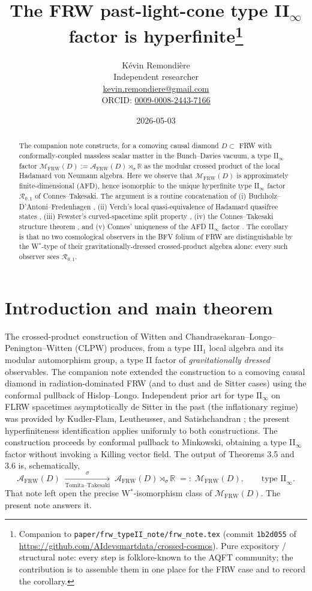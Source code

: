 \documentclass[11pt]{article}
\title{The FRW past-light-cone type II$_\infty$ factor is hyperfinite\thanks{Companion to \texttt{paper/frw\_typeII\_note/frw\_note.tex} (commit \texttt{1b2d055} of \url{https://github.com/AIdevsmartdata/crossed-cosmos}). Pure expository / structural note: every step is folklore-known to the AQFT community; the contribution is to assemble them in one place for the FRW case and to record the corollary.}}
\author{K\'evin Remondi\`ere\\
\small Independent researcher\\
\small \href{mailto:kevin.remondiere@gmail.com}{kevin.remondiere@gmail.com}\\
\small ORCID: \href{https://orcid.org/0009-0008-2443-7166}{0009-0008-2443-7166}}
\date{2026-05-03}
\theoremstyle{definition}
\newcommand{\R}{\mathbb{R}}
\renewcommand{\AA}{\mathcal{A}}
\newcommand{\MM}{\mathcal{M}}
\newcommand{\RR}{\mathcal{R}}
\newcommand{\FRW}{\mathrm{FRW}}
\begin{document}
\maketitle

\begin{abstract}
The companion note \cite{FrwNote2026} constructs, for a comoving causal diamond
$D \subset $ FRW with conformally-coupled massless scalar matter in the
Bunch--Davies vacuum, a type II$_\infty$ factor
$\MM_\FRW(D) := \AA_\FRW(D) \rtimes_\sigma \R$ as the modular crossed product
of the local Hadamard von Neumann algebra. Here we observe that
$\MM_\FRW(D)$ is approximately finite-dimensional (AFD), hence isomorphic to
the unique hyperfinite type II$_\infty$ factor $\RR_{0,1}$ of Connes--Takesaki.
The argument is a routine concatenation of (i) Buchholz--D'Antoni--Fredenhagen
\cite{BDF1987}, (ii) Verch's local quasi-equivalence of Hadamard quasifree
states \cite{Verch1994}, (iii) Fewster's curved-spacetime split property
\cite{Fewster2015Split}, (iv) the Connes--Takesaki structure theorem
\cite{ConnesTakesaki1977}, and (v) Connes' uniqueness of the AFD II$_\infty$
factor \cite{Connes1976}. The corollary is that no two cosmological observers
in the BFV folium of FRW are distinguishable by the W$^*$-type of their
gravitationally-dressed crossed-product algebra alone: every such observer sees
$\RR_{0,1}$.
\end{abstract}

\section{Introduction and main theorem}\label{sec:intro}

The crossed-product construction of Witten \cite{Witten2022} and
Chandrasekaran--Longo--Penington--Witten (CLPW) \cite{CLPW2023} produces, from
a type III$_1$ local algebra and its modular automorphism group, a type II
factor of \emph{gravitationally dressed} observables. The companion note
\cite{FrwNote2026} extended the construction to a comoving causal diamond
in radiation-dominated FRW (and to dust and de Sitter cases) using
the conformal pullback of Hislop--Longo. Independent prior art for type
$\mathrm{II}_\infty$ on FLRW spacetimes asymptotically de Sitter in the past
(the inflationary regime) was provided by Kudler-Flam, Leutheusser, and
Satishchandran \cite{KLS24}; the present hyperfiniteness identification
applies uniformly to both constructions. The construction proceeds by conformal pullback to Minkowski, obtaining a type II$_\infty$ factor without invoking a Killing vector field. The output of \cite{FrwNote2026}
Theorems 3.5 and 3.6 is, schematically,
\[
\AA_\FRW(D)\;\xrightarrow[\text{Tomita--Takesaki}]{\;\sigma\;}\;
\AA_\FRW(D)\rtimes_\sigma \R \;=:\; \MM_\FRW(D),
\qquad \text{type II}_\infty.
\]
That note left open the precise W$^*$-isomorphism class of $\MM_\FRW(D)$.
The present note answers it.
\end{document}
